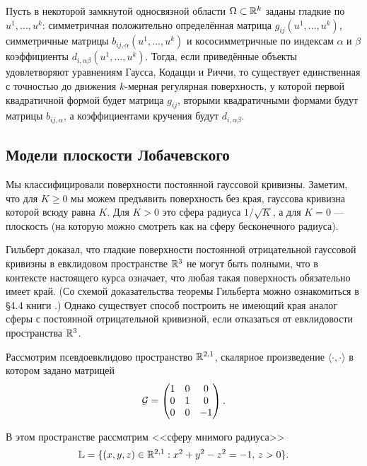 \begin{theorem}[Бонне]
	Пусть в некоторой замкнутой односвязной области $\Omega \subset \mathbb{R}^k$ заданы гладкие по $u^1, \ldots, u^k$: симметричная положительно определённая матрица $g_{ij}(u^1, \ldots, u^k)$, симметричные матрицы $b_{ij, \alpha}(u^1, \ldots, u^k)$ и кососимметричные по индексам $\alpha$ и $\beta$ коэффициенты $d_{i, \alpha\beta}(u^1, \ldots, u^k)$. Тогда, если приведённые объекты удовлетворяют уравнениям Гаусса, Кодацци и Риччи, то существует единственная с точностью до движения $k$-мерная регулярная поверхность, у которой первой квадратичной формой будет матрица $g_{ij}$, вторыми квадратичными формами будут матрицы $b_{ij, \alpha}$, а коэффициентами кручения будут $d_{i, \alpha\beta}$.
\end{theorem}

\subsection{Модели плоскости Лобачевского}

Мы классифицировали поверхности постоянной гауссовой кривизны. Заметим, что для $K \geqslant 0$ мы можем предъявить поверхность без края, гауссова кривизна которой всюду равна $K$. Для $K > 0$ это сфера радиуса $1 / \sqrt{K}$, а для $K = 0$ --- плоскость (на которую можно смотреть как на сферу бесконечного радиуса).

Гильберт доказал, что гладкие поверхности постоянной отрицательной гауссовой кривизны в евклидовом пространстве $\mathbb{R}^3$ не могут быть полными, что в контексте настоящего курса означает, что любая такая поверхность обязательно имеет край. (Со схемой доказательства теоремы Гильберта можно ознакомиться в \S 4{.}4 книги \cite{NT14}.) Однако существует способ построить не имеющий края аналог сферы с постоянной отрицательной кривизной, если отказаться от евклидовости пространства $\mathbb{R}^3$.

Рассмотрим псевдоевклидово пространство $\mathbb{R}^{2, 1}$, скалярное произведение $\langle\cdot, \cdot\rangle$ в котором задано матрицей
\begin{equation*}
	\mathcal{G} =
	\begin{pmatrix}
		1 & 0 & 0\\
		0 & 1 & 0\\
		0 & 0 & -1
	\end{pmatrix}.
\end{equation*}

\noindent
В этом пространстве рассмотрим <<сферу мнимого радиуса>>
\[
	\mathbb{L} = \{(x, y, z) \in \mathbb{R}^{2, 1} : x^2 + y^2 - z^2 = -1,\,z > 0\}.
\]

